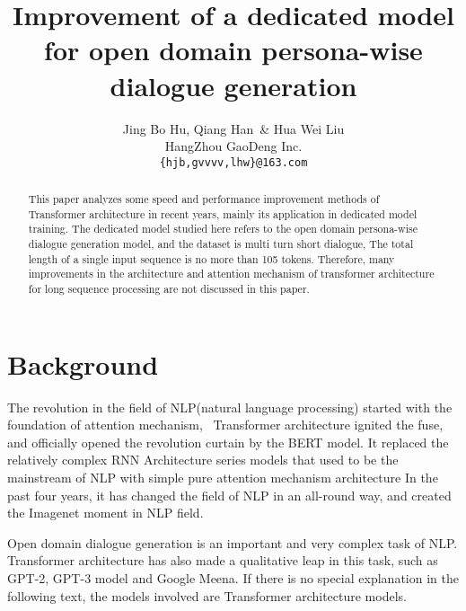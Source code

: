 \documentclass[letterpaper]{article} %
\DeclareRobustCommand{\citeext}[1]{\cite[#1]{#1}}
\begin{document}
\title{Improvement of a dedicated model for open domain persona-wise dialogue generation}
\author{Jing Bo Hu, Qiang Han~\& Hua Wei Liu \\
HangZhou GaoDeng Inc. \\
{\tt \{hjb,gvvvv,lhw\}@163.com} \\}

\maketitle
\begin{abstract}
This paper analyzes some speed and performance improvement methods of Transformer architecture in recent years, mainly its application in dedicated model training. The dedicated model studied here refers to the open domain persona-wise dialogue generation model, and the dataset is multi turn short dialogue, The total length of a single input sequence is no more than 105 tokens. Therefore, many improvements in the architecture and attention mechanism of transformer architecture for long sequence processing are not discussed in this paper. 
\end{abstract}

\section[Background]{Background} 
The revolution in the field of NLP(natural language processing) started with the foundation of attention mechanism\citeext {Bahdanau2015}, ~Transformer architecture\citeext{Vaswani2017} ignited the fuse, and officially opened the revolution curtain by the BERT model\citeext{Devilin2019}. It replaced the relatively complex RNN Architecture series models that used to be the mainstream of NLP with simple pure attention mechanism architecture In the past four years, it has changed the field of NLP in an all-round way, and created the Imagenet moment\citeext{ruder2018nlpimagenet} in NLP field. 

Open domain dialogue generation is an important and very complex task of NLP. Transformer architecture has also made a qualitative leap in this task, such as GPT-2, GPT-3 model and Google Meena\citeext{Radford2019, Brown2020, Adiwardana2020}. If there is no special explanation in the following text, the models involved are Transformer architecture models. 
\end{document}
